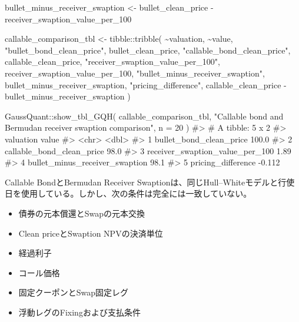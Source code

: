 \documentclass[
  letterpaper,
  DIV=11,
  numbers=noendperiod]{scrreprt}
\newenvironment{Shaded}{\begin{snugshade}}{\end{snugshade}}
\newcommand{\AttributeTok}[1]{\textcolor[rgb]{0.40,0.45,0.13}{#1}}
\newcommand{\CommentTok}[1]{\textcolor[rgb]{0.37,0.37,0.37}{#1}}
\newcommand{\DecValTok}[1]{\textcolor[rgb]{0.68,0.00,0.00}{#1}}
\newcommand{\FunctionTok}[1]{\textcolor[rgb]{0.28,0.35,0.67}{#1}}
\newcommand{\NormalTok}[1]{\textcolor[rgb]{0.00,0.23,0.31}{#1}}
\newcommand{\OtherTok}[1]{\textcolor[rgb]{0.00,0.23,0.31}{#1}}
\newcommand{\SpecialCharTok}[1]{\textcolor[rgb]{0.37,0.37,0.37}{#1}}
\newcommand{\StringTok}[1]{\textcolor[rgb]{0.13,0.47,0.30}{#1}}
\providecommand{\tightlist}{%
  \setlength{\itemsep}{0pt}\setlength{\parskip}{0pt}}
\begin{document}
\begin{Shaded}
\begin{Highlighting}[]
\NormalTok{bullet\_minus\_receiver\_swaption }\OtherTok{\textless{}{-}}\NormalTok{ bullet\_clean\_price }\SpecialCharTok{{-}}
\NormalTok{  receiver\_swaption\_value\_per\_100}

\NormalTok{callable\_comparison\_tbl }\OtherTok{\textless{}{-}}\NormalTok{ tibble}\SpecialCharTok{::}\FunctionTok{tribble}\NormalTok{(}
  \SpecialCharTok{\textasciitilde{}}\NormalTok{valuation,                           }\SpecialCharTok{\textasciitilde{}}\NormalTok{value,}
  \StringTok{"bullet\_bond\_clean\_price"}\NormalTok{,             bullet\_clean\_price,}
  \StringTok{"callable\_bond\_clean\_price"}\NormalTok{,           callable\_clean\_price,}
  \StringTok{"receiver\_swaption\_value\_per\_100"}\NormalTok{,     receiver\_swaption\_value\_per\_100,}
  \StringTok{"bullet\_minus\_receiver\_swaption"}\NormalTok{,      bullet\_minus\_receiver\_swaption,}
  \StringTok{"pricing\_difference"}\NormalTok{,                  callable\_clean\_price }\SpecialCharTok{{-}}
\NormalTok{                                           bullet\_minus\_receiver\_swaption}
\NormalTok{)}

\NormalTok{GaussQuant}\SpecialCharTok{::}\FunctionTok{show\_tbl\_GQH}\NormalTok{(}
\NormalTok{  callable\_comparison\_tbl,}
  \StringTok{"Callable bond and Bermudan receiver swaption comparison"}\NormalTok{,}
  \AttributeTok{n =} \DecValTok{20}
\NormalTok{)}
\CommentTok{\#\textgreater{} \# A tibble: 5 x 2}
\CommentTok{\#\textgreater{}   valuation                         value}
\CommentTok{\#\textgreater{}   \textless{}chr\textgreater{}                             \textless{}dbl\textgreater{}}
\CommentTok{\#\textgreater{} 1 bullet\_bond\_clean\_price         100.0  }
\CommentTok{\#\textgreater{} 2 callable\_bond\_clean\_price        98.0  }
\CommentTok{\#\textgreater{} 3 receiver\_swaption\_value\_per\_100   1.89 }
\CommentTok{\#\textgreater{} 4 bullet\_minus\_receiver\_swaption   98.1  }
\CommentTok{\#\textgreater{} 5 pricing\_difference               {-}0.112}
\end{Highlighting}
\end{Shaded}

Callable BondとBermudan Receiver
Swaptionは、同じHull--Whiteモデルと行使日を使用している。しかし、次の条件は完全には一致していない。

\begin{itemize}
\tightlist
\item
  債券の元本償還とSwapの元本交換
\item
  Clean priceとSwaption NPVの決済単位
\item
  経過利子
\item
  コール価格
\item
  固定クーポンとSwap固定レグ
\item
  浮動レグのFixingおよび支払条件
\end{itemize}
\end{document}
